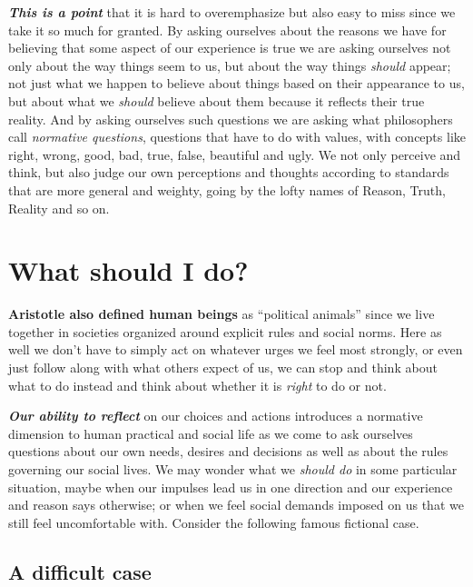 \documentclass[
  12pt, openany]{book}
\theoremstyle{definition}
\theoremstyle{definition}
\theoremstyle{definition}
\theoremstyle{remark}
\begin{document}
\textbf{\emph{This is a point}} that it is hard to overemphasize but also easy to miss since we take it so much for granted. By asking ourselves about the reasons we have for believing that some aspect of our experience is true we are asking ourselves not only about the way things seem to us, but about the way things \emph{should} appear; not just what we happen to believe about things based on their appearance to us, but about what we \emph{should} believe about them because it reflects their true reality. And by asking ourselves such questions we are asking what philosophers call \emph{normative questions}, questions that have to do with values, with concepts like right, wrong, good, bad, true, false, beautiful and ugly. We not only perceive and think, but also judge our own perceptions and thoughts according to standards that are more general and weighty, going by the lofty names of Reason, Truth, Reality and so on.

\hypertarget{what-should-i-do}{%
\section{What should I do?}\label{what-should-i-do}}

\textbf{Aristotle also defined human beings} as ``political animals'' since we live together in societies organized around explicit rules and social norms. Here as well we don't have to simply act on whatever urges we feel most strongly, or even just follow along with what others expect of us, we can stop and think about what to do instead and think about whether it is \emph{right} to do or not.

\textbf{\emph{Our ability to reflect}} on our choices and actions introduces a normative dimension to human practical and social life as we come to ask ourselves questions about our own needs, desires and decisions as well as about the rules governing our social lives. We may wonder what we \emph{should do} in some particular situation, maybe when our impulses lead us in one direction and our experience and reason says otherwise; or when we feel social demands imposed on us that we still feel uncomfortable with. Consider the following famous fictional case.

\hypertarget{a-difficult-case}{%
\subsection*{A difficult case}\label{a-difficult-case}}
\end{document}
